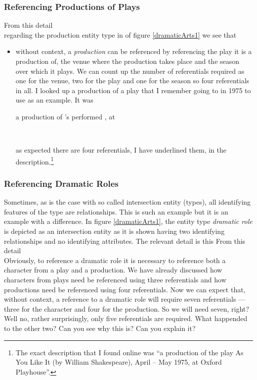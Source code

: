 \subsubsection{Referencing Productions of Plays}
From this detail 
\begin{equation*}

\end{equation*}
regarding the production entity type in  of figure \ref{dramaticArts1} we see that
\begin{itemize}
  \item
  without context, a \textit{production} can be referenced by referencing the play it is a production of, 
  the venue where the production takes place and the season 
  over which it plays. 
  We can count up the number of referentials required
  as one for the venue, two for the play and one for the season so four referentials in all. 
  I looked up a production of a play that I remember going to in 1975
  to use as an example. 
  It was
\begin{erquote}
\parbox{9cm}{a production of \mbox{'s} 
 performed \mbox{,} at }\\
\end{erquote}
as expected there are four referentials, I have underlined them, in the description.\footnote{
The exact description that I found online was ``a production of the play As You Like It (by William Shakespeare), April – May 1975, at Oxford Playhouse''.  
} 
\end{itemize}

 \subsubsection{Referencing Dramatic Roles}
 \mynote
Sometimes, as is the case with so called intersection entity (types), 
all identifying features of the type are relationships. 
This is such an example but it is an example with a difference.
\mynote
In figure \ref{dramaticArts1}, the entity type \textit{dramatic role} is
depicted as an intersection entity as it is shown having
two identifying relationships and no identifying attributes.
The relevant detail is  this
From this detail 
\begin{equation*}

\end{equation*}
Obviously, to reference a dramatic role it is necessary to reference
both a character from a play and a production. 
We have already discussed how characters from plays need be referenced using three referentials
and  how productions need be referenced using four referentials.  
\mynote
Now we can expect that, without context, a reference to
a dramatic role will require seven referentials
 --- three for the character and four for the production. 
So we will need seven, right?
 Well no, rather surprisingly, only five referentials are required. 
 What happended to the other two? Can you see why this is? Can you explain it?

